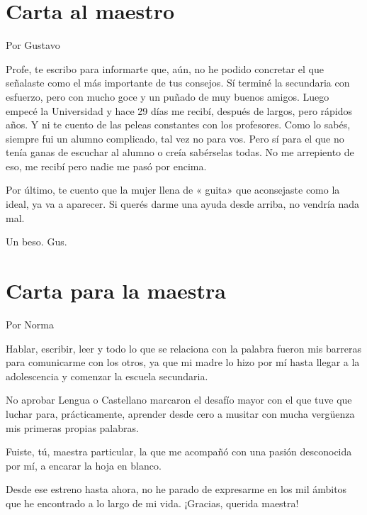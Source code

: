 \documentclass[11pt,twoside,openright,a5paper]{book}
\begin{document}
\section*{Carta al maestro}

\begin{flushright}Por Gustavo\end{flushright}

Profe, te escribo para informarte que, aún, no he podido concretar el que señalaste como el más importante de tus consejos. Sí terminé la secundaria con esfuerzo, pero con mucho goce y un puñado de muy buenos amigos. Luego empecé la Universidad y hace 29 días me recibí, después  de largos, pero rápidos años. Y ni te cuento de las peleas constantes con los profesores. Como lo sabés, siempre fui un alumno complicado, tal vez no para vos. Pero sí para el que no tenía ganas de escuchar al alumno o creía sabérselas todas. No me arrepiento de eso, me recibí pero nadie me pasó por encima.

Por último, te cuento que la mujer llena de « guita»  que aconsejaste como la ideal, ya va a aparecer. Si querés darme una ayuda desde arriba, no vendría nada mal.

Un beso. Gus.


\section*{Carta para la maestra}
                                                                          \begin{flushright}Por Norma\end{flushright}

Hablar, escribir, leer y todo lo que se relaciona con la palabra fueron mis barreras para comunicarme con los otros, ya que mi madre lo hizo por mí hasta llegar a la adolescencia y comenzar la escuela secundaria.

No aprobar Lengua o Castellano marcaron el desafío mayor con el que tuve que luchar para, prácticamente, aprender desde cero a musitar con mucha vergüenza mis primeras propias palabras.

Fuiste, tú, maestra particular, la que me acompañó con una pasión desconocida por mí,  a encarar la hoja en blanco.

Desde ese estreno hasta ahora, no he parado de expresarme en los mil ámbitos que he
encontrado a lo largo de mi vida. ¡Gracias, querida maestra!
\end{document}
